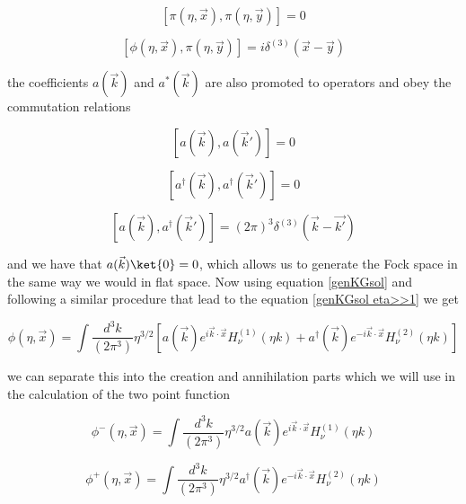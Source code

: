 \documentclass[a4paper,11pt]{article}
\numberwithin{equation}{section}
\numberwithin{figure}{section}
\begin{document}
\begin{large}
\begin{equation}
\label{cc2}
    [\pi(\eta,\Vec{x}),\pi(\eta,\Vec{y})]=0
\end{equation}

\begin{equation}
\label{cc3}
    [\phi(\eta,\Vec{x}),\pi(\eta,\Vec{y})]=i\delta^{(3)}(\Vec{x}-\Vec{y})
\end{equation}

the coefficients $a(\Vec{k})$ and $a^*(\Vec{k})$ are also promoted to operators and obey the commutation relations 

\begin{equation}
\label{cc4}    
    [a(\Vec{k}),a(\Vec{k}')]=0
\end{equation}

\begin{equation}
\label{cc5}    
    [a^\dagger(\Vec{k}),a^\dagger(\Vec{k}')]=0
\end{equation}


\begin{equation}
\label{cc6}    
    [a(\Vec{k}),a^\dagger(\Vec{k}')]=(2\pi)^3\delta^{(3)}(\Vec{k}-\Vec{k'})
\end{equation}


and we have that $a(\Vec{k})\ket{0}=0$, which allows us to generate the Fock space in the same way we would in flat space. Now using equation \eqref{genKGsol} and following a similar procedure that lead to the equation \eqref{genKGsol eta>>1} we get 

\begin{equation}
\label{quantphi}    
    \phi(\eta,\Vec{x})=\int \frac{d^3k}{(2\pi^3)}\eta^{3/2}[a(\Vec{k})e^{i\Vec{k}\cdot\Vec{x}}H_\nu^{(1)}(\eta k)+a^\dagger(\Vec{k})e^{-i\Vec{k}\cdot\Vec{x}}H_\nu^{(2)}(\eta k)]
\end{equation}

we can separate this into the creation and annihilation parts which we will use in the calculation of the two point function

\begin{equation}
\label{quantphi-}    
    \phi^-(\eta,\Vec{x})=\int \frac{d^3k}{(2\pi^3)}\eta^{3/2}a(\Vec{k})e^{i\Vec{k}\cdot\Vec{x}}H_\nu^{(1)}(\eta k)
\end{equation}

\begin{equation}
\label{quantphi+}    
    \phi^+(\eta,\Vec{x})=\int \frac{d^3k}{(2\pi^3)}\eta^{3/2}a^\dagger(\Vec{k})e^{-i\Vec{k}\cdot\Vec{x}}H_\nu^{(2)}(\eta k)
\end{equation}


\end{large}
\end{document}
